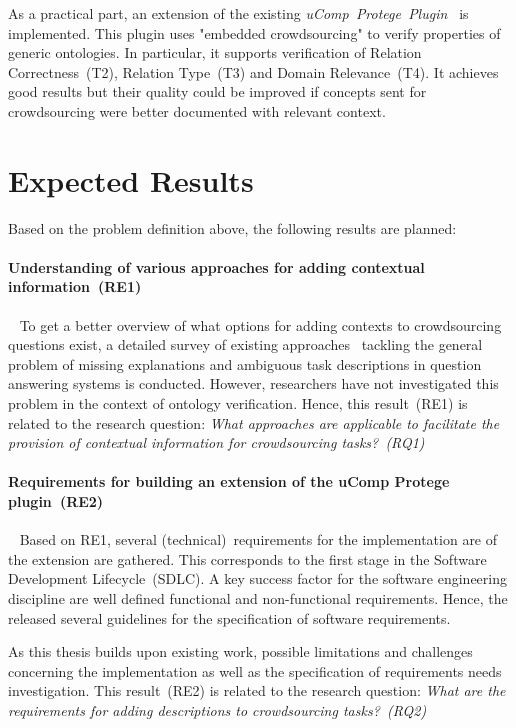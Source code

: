 \documentclass[12pt, notitlepage]{article}
\begin{document}
As a practical part, an extension of the existing \emph{uComp~Protege~Plugin~\cite{wohlgenannt2016crowd}} is implemented. This plugin uses "embedded crowdsourcing" to verify properties of generic ontologies. In particular, it supports verification of Relation Correctness~(T2), Relation Type~(T3) and Domain Relevance~(T4). It achieves good results but their quality could be improved if concepts sent for crowdsourcing were better documented with relevant context. 

\section{Expected Results}
Based on the problem definition above, the following results are planned:
\paragraph{Understanding of various approaches for adding contextual information~(RE1)}~
To get a better overview of what options for adding contexts to crowdsourcing questions exist, a detailed survey of existing approaches~\cite{hoffmann2010context, hoffner2016survey} tackling the general problem of missing explanations and ambiguous task descriptions in question answering systems is conducted. However, researchers have not investigated this problem in the context of ontology verification. Hence, this result~(RE1) is related to the research question: \emph{What approaches are applicable to facilitate the provision of contextual information for crowdsourcing tasks?~(RQ1)}
\paragraph{Requirements for building an extension of the uComp Protege plugin\cite{wohlgenannt2016crowd}~(RE2)}~
Based on RE1, several (technical)~requirements for the implementation are of the extension are gathered. This corresponds to the first stage in the Software Development Lifecycle~(SDLC)\cite{ruparelia2010}. A key success factor for the software engineering discipline are well defined functional and non-functional requirements. Hence, the \citet{ieeeSoftwareRequirements} released several guidelines for the specification of software requirements. 

As this thesis builds upon existing work, possible limitations and challenges concerning the implementation as well as the specification of requirements needs investigation. This result~(RE2) is related to the research question: \emph{What are the requirements for adding descriptions to crowdsourcing tasks?~(RQ2)}
\end{document}
